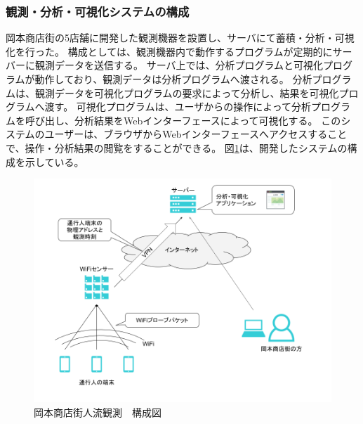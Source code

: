 \subsubsection{観測・分析・可視化システムの構成}
岡本商店街の5店舗に開発した観測機器を設置し、サーバにて蓄積・分析・可視化を行った。
構成としては、観測機器内で動作するプログラムが定期的にサーバーに観測データを送信する。
サーバ上では、分析プログラムと可視化プログラムが動作しており、観測データは分析プログラムへ渡される。
分析プログラムは、観測データを可視化プログラムの要求によって分析し、結果を可視化プログラムへ渡す。
可視化プログラムは、ユーザからの操作によって分析プログラムを呼び出し、分析結果をWebインターフェースによって可視化する。
このシステムのユーザーは、ブラウザからWebインターフェースへアクセスすることで、操作・分析結果の閲覧をすることができる。
図\ref{fig:okamoto_diag1}は、開発したシステムの構成を示している。
\begin{figure}[htbp]
\includegraphics[width=16cm]{images/okamoto_diag1.png}
\caption{岡本商店街人流観測　構成図}
\label{fig:okamoto_diag1}
\end{figure}

